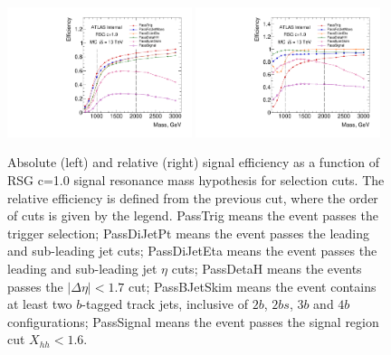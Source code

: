 \begin{figure}
\begin{center}
\includegraphics[width=0.48\textwidth,angle=-90]{figures/boosted/SigEff/evtsel_Moriond_Efficiency_PreSel.pdf}
\includegraphics[width=0.48\textwidth,angle=-90]{figures/boosted/SigEff/evtsel_Moriond_Efficiency_PreSel_rel.pdf}
  \caption{Absolute (left) and relative (right) signal efficiency as a function of RSG c=1.0 signal resonance mass hypothesis for selection cuts. The relative efficiency is defined from the previous cut, where the order of cuts is given by the legend. PassTrig means the event passes the trigger selection; PassDiJetPt means the event passes the leading and sub-leading jet \pt cuts; PassDiJetEta means the event passes the leading and sub-leading jet $\eta$ cuts; PassDetaH means the events passes the $|\Delta \eta| < 1.7$ cut; PassBJetSkim means the event contains at least two $b$-tagged track jets, inclusive of $2b$, $2bs$, $3b$ and $4b$ configurations; PassSignal means the event passes the signal region cut $X_{hh} < 1.6$.}
  \label{fig:boosted-selection-efficiency}
\end{center}
\end{figure}

